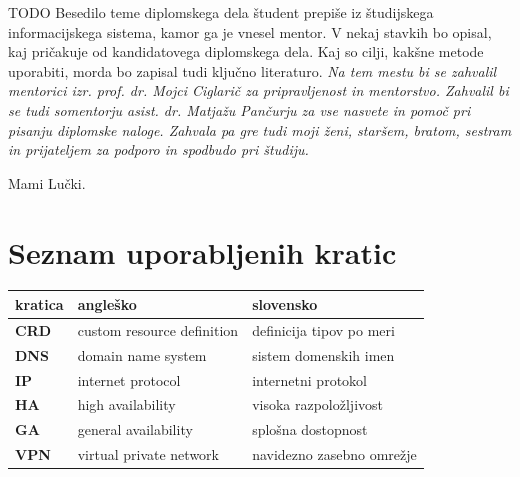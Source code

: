\documentclass[a4paper, 12pt]{book}
\newcommand{\clearemptydoublepage}{\newpage{\pagestyle{empty}\cleardoublepage}}
\begin{document}
TODO
Besedilo teme diplomskega dela študent prepiše iz študijskega informacijskega sistema, kamor ga je vnesel mentor. V nekaj stavkih bo opisal, kaj pričakuje od kandidatovega diplomskega dela. Kaj so cilji, kakšne metode uporabiti, morda bo zapisal tudi ključno literaturo.
\vspace{15mm}
\vspace{2cm}
\clearemptydoublepage
\thispagestyle{empty}\mbox{}\vfill\null\it%
\noindent
Na tem mestu bi se zahvalil mentorici izr. prof. dr. Mojci Ciglarič za pripravljenost in mentorstvo.
Zahvalil bi se tudi somentorju asist. dr. Matjažu Pančurju za vse nasvete in pomoč pri pisanju diplomske naloge.
Zahvala pa gre tudi moji ženi, staršem, bratom, sestram in prijateljem za podporo in spodbudo pri študiju.
\rm\normalfont
\clearemptydoublepage
\thispagestyle{empty}\mbox{}{\textheight}\mbox{}\hfill\begin{minipage}{0.55\textwidth}%
Mami Lučki.
\normalfont\end{minipage}
\clearemptydoublepage
\pagestyle{empty}
\def\thepage{}%
\tableofcontents{}
\clearemptydoublepage
\chapter*{Seznam uporabljenih kratic}  %
\noindent\begin{tabular}{p{}|p{}|p{}}    %
  {\bf kratica} & {\bf angleško}                             & {\bf slovensko} \\ \hline
  {\bf CRD} & custom resource definition & definicija tipov po meri \\
  {\bf DNS} & domain name system & sistem domenskih imen \\
  {\bf IP} & internet protocol & internetni protokol \\
  {\bf HA} & high availability & visoka razpoložljivost \\
  {\bf GA} & general availability & splošna dostopnost \\
  {\bf VPN} & virtual private network & navidezno zasebno omrežje \\
\end{tabular}
\clearemptydoublepage
\end{document}
